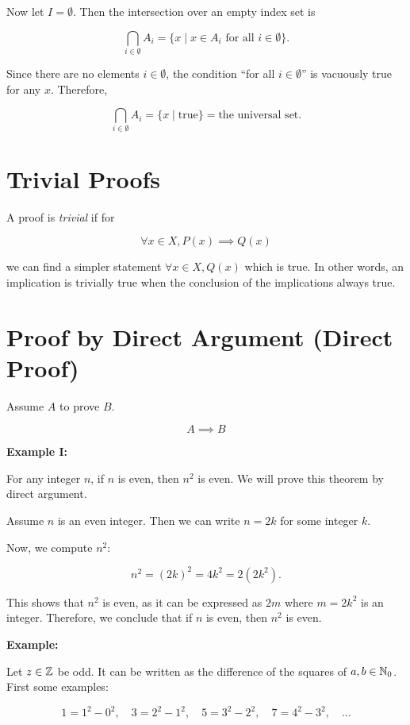 Now let \(I = \emptyset\). Then the intersection over an empty index set is

\[
	\bigcap_{i \in \emptyset} A_i = \{ x \mid x \in A_i \text{ for all } i \in \emptyset \}.
\]

Since there are no elements \(i \in \emptyset\), the condition ``for all \(i \in \emptyset\)'' is vacuously true for any \(x\). Therefore,

\[
	\bigcap_{i \in \emptyset} A_i = \{ x \mid \text{true} \} = \text{the universal set}.
\]

\QED

\section{Trivial Proofs}

A proof is \emph{trivial} if for

\[
	\forall x \in X, P(x) \implies Q(x)
\]

we can find a simpler statement \(\forall x \in X, Q(x)\) which is true. In other words, an
implication is trivially true when the conclusion of the implications always true.

\section{Proof by Direct Argument (Direct Proof)}

Assume \(A\) to prove \(B\).

\[
	A \implies B
\]

\textbf{Example I:}

For any integer \(n\), if \(n\) is even, then \( n^2 \) is even.
We will prove this theorem by direct argument.

Assume \(n\) is an even integer. Then we can write \( n = 2k \) for some integer \(k\).

Now, we compute \( n^2 \):

\[
	n^2 = {(2k)}^2 = 4k^2 = 2(2k^2).
\]

This shows that \( n^2 \) is even, as it can be expressed as \( 2m \) where \( m = 2k^2 \) is an integer.
Therefore, we conclude that if \(n\) is even, then \( n^2 \) is even.

\QED

\textbf{Example:}

Let \(z \in \mathbb{Z}\) be odd. It can be written as the difference of the squares of \(a, b \in \mathbb{N}_0\). First some
examples:

\[
	1 = 1^2 - 0^2, \quad 3 = 2^2 - 1^2, \quad 5 = 3^2 - 2^2, \quad 7 = 4^2 - 3^2, \quad \dots
\]

